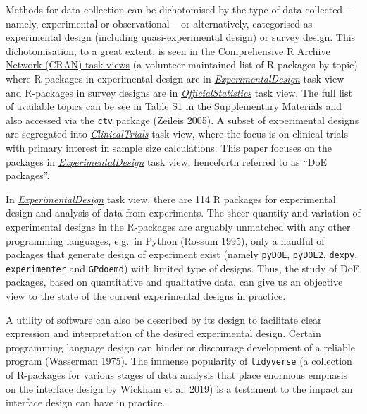 \documentclass{article}
\begin{document}
Methods for data collection can be dichotomised by the type of data
collected -- namely, experimental or observational -- or alternatively,
categorised as experimental design (including quasi-experimental design)
or survey design. This dichotomisation, to a great extent, is seen in
the \href{https://cran.r-project.org/web/views/}{Comprehensive R Archive
Network (CRAN) task views} (a volunteer maintained list of R-packages by
topic) where R-packages in experimental design are in
\href{http://CRAN.R-project.org/view=ExperimentalDesign}{\emph{ExperimentalDesign}}
task view and R-packages in survey designs are in
\href{http://CRAN.R-project.org/view=OfficialStatistics}{\emph{OfficialStatistics}}
task view. The full list of available topics can be see in Table S1 in
the Supplementary Materials and also accessed via the \texttt{ctv}
package (Zeileis 2005). A subset of experimental designs are segregated
into
\href{http://CRAN.R-project.org/view=ClinicalTrials}{\emph{ClinicalTrials}}
task view, where the focus is on clinical trials with primary interest
in sample size calculations. This paper focuses on the packages in
\href{http://CRAN.R-project.org/view=ExperimentalDesign}{\emph{ExperimentalDesign}}
task view, henceforth referred to as ``DoE packages''.

In
\href{http://CRAN.R-project.org/view=ExperimentalDesign}{\emph{ExperimentalDesign}}
task view, there are 114 R packages for experimental design and analysis
of data from experiments. The sheer quantity and variation of
experimental designs in the R-packages are arguably unmatched with any
other programming languages, e.g.~in Python (Rossum 1995), only a
handful of packages that generate design of experiment exist (namely
\texttt{pyDOE}, \texttt{pyDOE2}, \texttt{dexpy}, \texttt{experimenter}
and \texttt{GPdoemd}) with limited type of designs. Thus, the study of
DoE packages, based on quantitative and qualitative data, can give us an
objective view to the state of the current experimental designs in
practice.

A utility of software can also be described by its design to facilitate
clear expression and interpretation of the desired experimental design.
Certain programming language design can hinder or discourage development
of a reliable program (Wasserman 1975). The immense popularity of
\texttt{tidyverse} (a collection of R-packages for various stages of
data analysis that place enormous emphasis on the interface design by
Wickham et al. 2019) is a testament to the impact an interface design
can have in practice.
\end{document}
